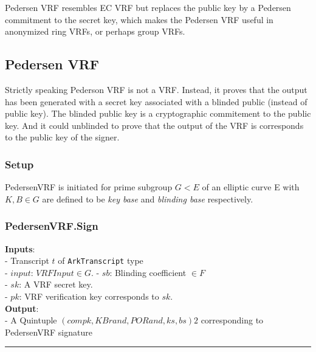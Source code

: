 \documentclass[
]{article}
\begin{document}
Pedersen VRF resembles EC VRF but replaces the public key by a Pedersen
commitment to the secret key, which makes the Pedersen VRF useful in
anonymized ring VRFs, or perhaps group VRFs.

\hypertarget{pedersen-vrf-1}{%
\subsection{Pedersen VRF}\label{pedersen-vrf-1}}

Strictly speaking Pederson VRF is not a VRF. Instead, it proves that the
output has been generated with a secret key associated with a blinded
public (instead of public key). The blinded public key is a
cryptographic commitement to the public key. And it could unblinded to
prove that the output of the VRF is corresponds to the public key of the
signer.

\hypertarget{setup}{%
\subsubsection{Setup}\label{setup}}

PedersenVRF is initiated for prime subgroup \(G < E\) of an elliptic
curve E with \(K, B \in G\) are defined to be \emph{key base} and
\emph{blinding base} respectively.

\hypertarget{pedersenvrf.sign}{%
\subsubsection{PedersenVRF.Sign}\label{pedersenvrf.sign}}

\textbf{Inputs}:\\
- Transcript \(t\) of \texttt{ArkTranscript} type\\
- \(input\): \(VRFInput \in G\). - \(sb\): Blinding coefficient
\(\in F\)\\
- \(sk\): A VRF secret key.\\
- \(pk\): VRF verification key corresponds to \(sk\).\\
\textbf{Output}:\\
- A Quintuple \((compk, KBrand, PORand, ks, bs)2\) corresponding to
PedersenVRF signature

\begin{center}\rule{0.5\linewidth}{0.5pt}\end{center}
\end{document}
